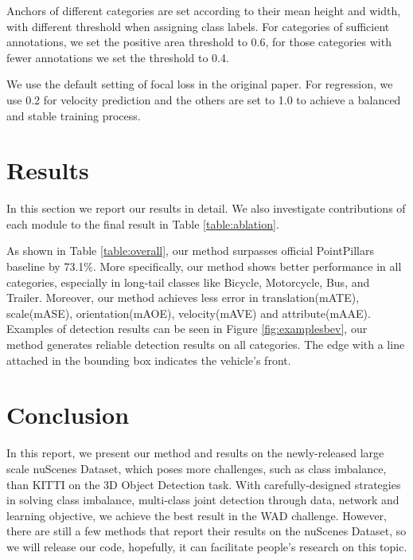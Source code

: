 \documentclass[10pt,twocolumn,letterpaper]{article}
\begin{document}
Anchors of different categories are set according to their mean height and width, with different threshold when assigning class labels. For categories of sufficient annotations, we set the positive area threshold to 0.6, for those categories with fewer annotations we set the threshold to 0.4.

We use the default setting of focal loss in the original paper. For  regression, we use 0.2 for velocity prediction and the others are set to 1.0 to achieve a balanced and stable training process.


\section{Results} \label{sec:results}
In this section we report our results in detail. We also investigate contributions of each module to the final result in Table \ref{table:ablation}.

As shown in Table \ref{table:overall}, our method surpasses official PointPillars \cite{pointpillars} baseline by 73.1\%. More specifically, our method shows better performance in all categories, especially in long-tail classes like Bicycle, Motorcycle, Bus, and Trailer. Moreover, our method achieves less error in translation(mATE), scale(mASE), orientation(mAOE), velocity(mAVE) and attribute(mAAE). Examples of detection results can be seen in Figure \ref{fig:examplesbev}, our method generates reliable detection results on all categories. The edge with a line attached in the bounding box indicates the vehicle's front.



\section{Conclusion} \label{sec:conclusion}

In this report, we present our method and results on the newly-released large scale nuScenes Dataset, which poses more challenges, such as class imbalance, than KITTI on the 3D Object Detection task. With carefully-designed strategies in solving class imbalance, multi-class joint detection through data, network and learning objective, we achieve the best result in the WAD challenge. However, there are still a few methods that report their results on the nuScenes Dataset, so we will release our code, hopefully, it can facilitate people's research on this topic.
\end{document}
